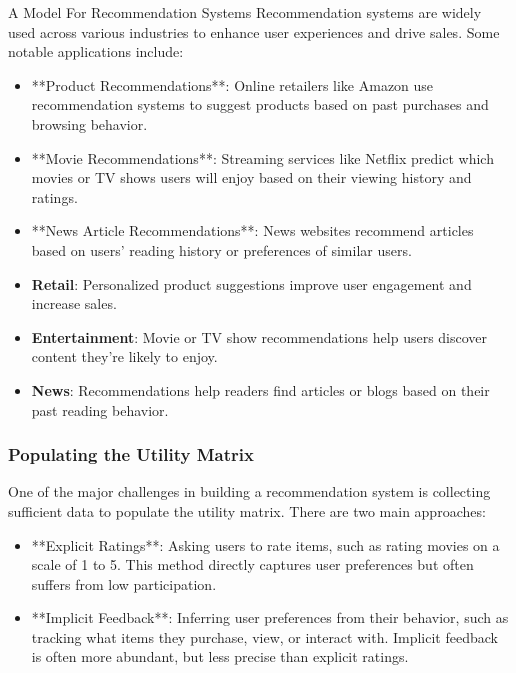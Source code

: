 \begin{notes}{A Model For Recommendation Systems}
    Recommendation systems are widely used across various industries to enhance user experiences and drive sales. Some notable applications include:
    
    \begin{itemize}
        \item **Product Recommendations**: Online retailers like Amazon use recommendation systems to suggest products based on past purchases and browsing behavior.
        \item **Movie Recommendations**: Streaming services like Netflix predict which movies or TV shows users will enjoy based on their viewing history and ratings.
        \item **News Article Recommendations**: News websites recommend articles based on users' reading history or preferences of similar users.
    \end{itemize}
    
    \begin{highlight}
        \begin{itemize}
            \item \textbf{Retail}: Personalized product suggestions improve user engagement and increase sales.
            \item \textbf{Entertainment}: Movie or TV show recommendations help users discover content they're likely to enjoy.
            \item \textbf{News}: Recommendations help readers find articles or blogs based on their past reading behavior.
        \end{itemize}
    \end{highlight}
    
    \subsubsection*{Populating the Utility Matrix}
    
    One of the major challenges in building a recommendation system is collecting sufficient data to populate the utility matrix. There are two main approaches:
    
    \begin{itemize}
        \item **Explicit Ratings**: Asking users to rate items, such as rating movies on a scale of 1 to 5. This method directly captures user preferences but often suffers from low participation.
        \item **Implicit Feedback**: Inferring user preferences from their behavior, such as tracking what items they purchase, view, or interact with. Implicit feedback is often more abundant, but less precise than 
        explicit ratings.
    \end{itemize}
    

\end{notes}
